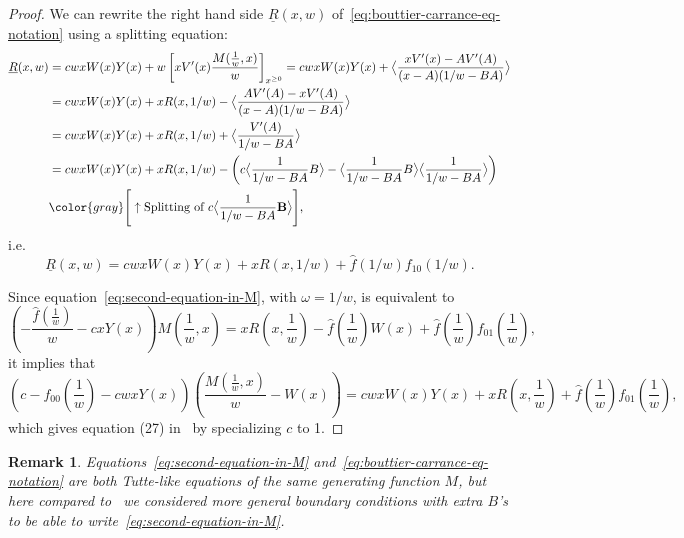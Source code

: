 \documentclass{scrartcl}
\newcommand{\gr}[1]{{\color{gray} #1}}
\newcommand\brak[1]{\big \langle #1 \big\rangle}
\newcommand\ul[1]{\underline{#1}}
\newtheorem{rem}{Remark}[section]
\begin{document}
\begin{proof}
We can rewrite the right hand side $\ul R(x,w)$ of~\eqref{eq:bouttier-carrance-eq-notation} using a splitting equation:
\begin{align*}
\ul R(x,w)  &= cw x W(x)Y(x) + w\left[xV'(x)\frac{M(\frac{1}{w},x)}{w}\right]_{x^{\geq 0}}= cw x W(x)Y(x)  + \brak{\frac{xV'(x) - AV'(A)}{(x-A)(1/w-BA)}} \\ 
&= cwxW(x)Y(x)  + xR(x,1/w)  -\brak{\frac{AV'(A)-xV'(A)}{(x-A)(1/w-BA)}} \\ 
&= cwxW(x)Y(x)  + xR(x,1/w)  + \brak{\frac{V'(A)}{1/w-BA}} \\ 
&= cwxW(x)Y(x)  + xR(x,1/w) - \left(c\brak{\frac{1}{1/w - BA}B} - \brak{\frac{1}{1/w-BA}B}\brak{\frac{1}{1/w-BA}}\right)\\ 
&\gr{\Bigg[\uparrow\textnormal{Splitting of } c\brak{\frac{1}{1/w - BA}\mathbf{B}}\Bigg]},
\end{align*} 
i.e.
\begin{equation}
\ul R(x,w)= cwxW(x)Y(x)  + xR(x,1/w) + \widehat{f}(1/w)f_{10}(1/w).
\label{eq:remainder-bc-expression}
\end{equation}

Since equation~\eqref{eq:second-equation-in-M}, with $\omega = 1/w$, is equivalent to
\[
\left(-\frac{\widehat{f}(\frac{1}{w})}{w} - cxY(x)\right)M\left(\frac{1}{w},x\right) =   xR\left(x,\frac{1}{w}\right) - \widehat{f}\left(\frac{1}{w}\right)W(x) + \widehat{f}\left(\frac{1}{w}\right)f_{01}\left(\frac{1}{w}\right),
\]
it implies that
\[
\left(c-f_{00}\left(\frac{1}{w}\right) - cwxY(x)\right)\left(\frac{M(\frac{1}{w},x)}{w}-W(x)\right) = cwxW(x)Y(x) + xR\left(x,\frac{1}{w}\right) + \widehat{f}\left(\frac{1}{w}\right)f_{01}\left(\frac{1}{w}\right),
\]
which gives equation (27) in~\cite{bouttier-carrance} by specializing $c$ to 1.
\end{proof}

\begin{rem}
Equations~\eqref{eq:second-equation-in-M} and~\eqref{eq:bouttier-carrance-eq-notation} are both Tutte-like equations of the same generating function $M$, but here compared to~\cite{bouttier-carrance} we considered more general boundary conditions with extra $B$'s to be able to write~\eqref{eq:second-equation-in-M}.
\end{rem}
\end{document}
